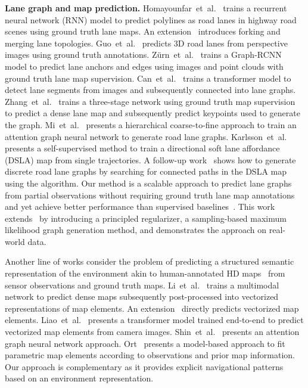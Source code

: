 \documentclass[letterpaper, 10 pt, conference]{ieeeconf}
\begin{document}
\noindent \textbf{Lane graph and map prediction.}
Homayounfar~et~al.~\cite{homayounfar2018hran} trains a recurrent neural network (RNN) model to predict polylines as road lanes in highway road scenes using ground truth lane maps. An extension~\cite{homayounfar2019dagmapper} introduces forking and merging lane topologies.
Guo~et~al.~\cite{guo2020genlanenet} predicts 3D road lanes from perspective images using ground truth annotations.
Z\"urn~et~al.~\cite{zurn2021lanegraphnet} trains a Graph-RCNN model to predict lane anchors and edges using images and point clouds with ground truth lane map supervision.
Can~et~al.~\cite{can2021stsu} trains a transformer model to detect lane segments from images and subsequently connected into lane graphs.
Zhang~et~al.~\cite{zhang2021hierarchical_road_topology_learning} trains a three-stage network using ground truth map supervision to predict a dense lane map and subsequently predict keypoints used to generate the graph.
Mi~et~al.~\cite{mi2021hdmapgen} presents a hierarchical coarse-to-fine approach to train an attention graph neural network to generate road lane graphs.
Karlsson~et~al.~\cite{karlsson2020dsla} presents a self-supervised method to train a directional soft lane affordance (DSLA) map from single trajectories. A follow-up work~\cite{karlsson2021gdsla} shows how to generate discrete road lane graphs by searching for connected paths in the DSLA map using the  algorithm. 
Our method is a scalable approach to predict lane graphs from partial observations without requiring ground truth lane map annotations and yet achieve better performance than supervised baselines~\cite{zurn2021lanegraphnet, can2021stsu}. This work extends~\cite{karlsson2020dsla,karlsson2021gdsla} by introducing a principled regularizer, a sampling-based maximum likelihood graph generation method, and demonstrates the approach on real-world data.

Another line of works consider the problem of predicting a structured semantic representation of the environment akin to human-annotated HD maps~\cite{sheif2016hdmaps} from sensor observations and ground truth maps. 
Li~et~al.~\cite{li2022hdmapnet} trains a multimodal network to predict dense maps subsequently post-processed into vectorized representations of map elements.
An extension~\cite{liu2023vectormapnet} directly predicts vectorized map elements.
Liao~et~al.~\cite{liaomaptr} presents a transformer model trained end-to-end to predict vectorized map elements from camera images.
Shin~et~al.~\cite{shin2023instagram} presents an attention graph neural network approach.
Ort~\cite{ort2022maplite2} presents a model-based approach to fit parametric map elements according to observations and prior map information.
Our approach is complementary as it provides explicit navigational patterns based on an environment representation.
\end{document}
